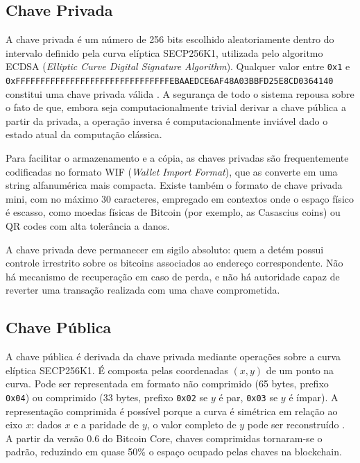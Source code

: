 \documentclass[12pt,a4paper]{report}
\begin{document}
\subsection{Chave Privada}

A chave privada é um número de 256 bits escolhido aleatoriamente dentro do intervalo definido pela curva elíptica SECP256K1, utilizada pelo algoritmo ECDSA (\textit{Elliptic Curve Digital Signature Algorithm}). Qualquer valor entre \texttt{0x1} e \texttt{0xFFFFFFFFFFFFFFFFFFFFFFFFFFFFFFFEBAAEDCE6AF48A03BBFD25E8CD0364140} constitui uma chave privada válida \cite{Bashir2023}. A segurança de todo o sistema repousa sobre o fato de que, embora seja computacionalmente trivial derivar a chave pública a partir da privada, a operação inversa é computacionalmente inviável dado o estado atual da computação clássica.

Para facilitar o armazenamento e a cópia, as chaves privadas são frequentemente codificadas no formato WIF (\textit{Wallet Import Format}), que as converte em uma string alfanumérica mais compacta. Existe também o formato de chave privada mini, com no máximo 30 caracteres, empregado em contextos onde o espaço físico é escasso, como moedas físicas de Bitcoin (por exemplo, as Casascius coins) ou QR codes com alta tolerância a danos.

A chave privada deve permanecer em sigilo absoluto: quem a detém possui controle irrestrito sobre os bitcoins associados ao endereço correspondente. Não há mecanismo de recuperação em caso de perda, e não há autoridade capaz de reverter uma transação realizada com uma chave comprometida.

\subsection{Chave Pública}

A chave pública é derivada da chave privada mediante operações sobre a curva elíptica SECP256K1. É composta pelas coordenadas $(x, y)$ de um ponto na curva. Pode ser representada em formato não comprimido (65 bytes, prefixo \texttt{0x04}) ou comprimido (33 bytes, prefixo \texttt{0x02} se $y$ é par, \texttt{0x03} se $y$ é ímpar). A representação comprimida é possível porque a curva é simétrica em relação ao eixo $x$: dados $x$ e a paridade de $y$, o valor completo de $y$ pode ser reconstruído \cite{Bashir2023}. A partir da versão 0.6 do Bitcoin Core, chaves comprimidas tornaram-se o padrão, reduzindo em quase 50\% o espaço ocupado pelas chaves na blockchain.
\end{document}
